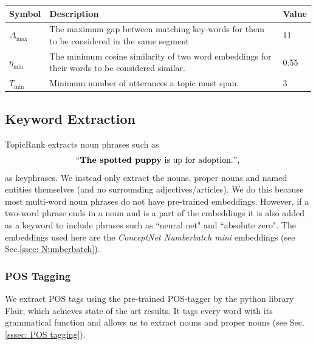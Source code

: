     \begin{table}[h]
        \centering
        \begin{tabularx}{0.9\textwidth}{| t | b | t |}
        \hline
        \textbf{Symbol} & \textbf{Description} & \textbf{Value} \\ \hline
        $\Delta_{\text{max}}$     & The maximum gap between matching key-words for them to be considered in the same segment & 11                    \\ \hline
        $\eta_{\text{min}}$     & The minimum cosine similarity of two word embeddings for their words to be considered similar. & 0.55                        \\ \hline
        $T_{\text{min}}$ & Minimum number of utterances a topic must span. & 3 \\ \hline
        
        \end{tabularx}
    \end{table}

    \subsection{Keyword Extraction}
        TopicRank extracts noun phrases such as
        \begin{equation*}
            ``\textbf{The spotted puppy}\text{ is up for adoption.}",
        \end{equation*}
        as keyphrases. We instead only extract the nouns, proper nouns and named entities themselves (and no surrounding adjectives/articles). We do this because most multi-word noun phrases do not have pre-trained embeddings. However, if a two-word phrase ends in a noun and is a part of the embeddings it is also added as a keyword to include phrases such as ``neural net" and ``absolute zero". The embeddings used here are the \textit{ConceptNet Numberbatch mini} embeddings (see Sec.\ref{ssec: Numberbatch}).
        
        \subsubsection{POS Tagging}
            We extract POS tags using the pre-trained POS-tagger by the python library Flair\cite{flairNLP}, which achieves state of the art results. It tags every word with its grammatical function and allows us to extract nouns and proper nouns (see Sec. \ref{sssec: POS tagging}).
        
